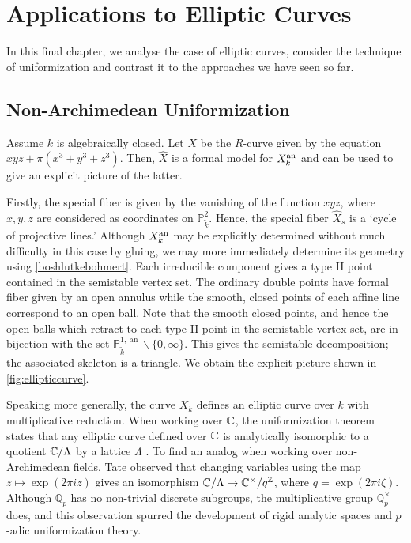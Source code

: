 \chapter{Applications to Elliptic Curves}

In this final chapter, we analyse the case of elliptic curves, consider the technique of uniformization and contrast it to the approaches we have seen so far.

\section{Non-Archimedean Uniformization}

Assume $k$ is algebraically closed.
Let $X$ be the $R$-curve given by the equation $xyz + \pi(x^3 + y^3 + z^3).$
Then, $\hat{X}$ is a formal model for $X^{\text{an}}_k$ and can be used to give an explicit picture of the latter.

Firstly, the special fiber is given by the vanishing of the function $xyz$, where $x, y, z$ are considered as coordinates on $\mathbb{P}^2_{\tilde{k}}$.
Hence, the special fiber $\hat{X}_s$ is a `cycle of projective lines.'
Although $X_k^{\text{an}}$ may be explicitly determined without much difficulty in this case by gluing, we may more immediately determine its geometry using \cref{boshlutkebohmert}.
Each irreducible component gives a type II point contained in the semistable vertex set.
The ordinary double points have formal fiber given by an open annulus while the smooth, closed points of each affine line correspond to an open ball.
Note that the smooth closed points, and hence the open balls which retract to each type II point in the semistable vertex set, are in bijection with the set $\mathbb{P}^{1, \operatorname{an}}_{\tilde{k}} \backslash \{0, \infty \}$.
This gives the semistable decomposition; the associated skeleton is a triangle.
We obtain the explicit picture shown in \cref{fig:ellipticcurve}.

Speaking more generally, the curve $X_k$ defines an elliptic curve over $k$ with multiplicative reduction.
When working over $\mathbb{C}$, the uniformization theorem states that any elliptic curve defined over $\mathbb{C}$ is analytically isomorphic to a quotient $\mathbb{C}/\Lambda$ by a lattice $\Lambda$ \parencite[\S VI.5]{silverman}.
To find an analog when working over non-Archimedean fields, Tate observed that changing variables using the map $z \mapsto \exp{(2 \pi i z)}$ gives an isomorphism $\mathbb{C}/\Lambda \to \mathbb{C}^{\times}/q^{\mathbb{Z}}$, where $q = \exp{(2 \pi i \zeta)}$.
Although $\mathbb{Q}_p$ has no non-trivial discrete subgroups, the multiplicative group $\mathbb{Q}_p^{\times}$ does, and this observation spurred the development of rigid analytic spaces and $p$-adic uniformization theory.

